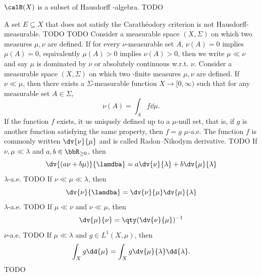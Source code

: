 \documentclass[a4paper,12pt]{article}
\begin{document}
$\calB(X)$ is a subset of Hausdorff \text{\textsigma}-algebra.
\bpr
TODO
\epr

A set $E\subseteq X$ that does not satisfy the Carathéodory criterion is not Hausdorff-measurable.
TODO
TODO
Consider a measurable space $(X,\Sigma)$ on which two measures $\mu,\nu$ are defined. If for every $\nu$-measurable set $A$, $\nu(A)=0$ implies $\mu(A)=0$, equivalently $\mu(A)>0$ implies $\nu(A)>0$, then we write $\mu\ll\nu$ and say $\mu$ is dominated by $\nu$ or absolutely continuous w.r.t. $\nu$.
Consider a measurable space $(X,\Sigma)$ on which two \textsigma-finite measures $\mu,\nu$ are defined. If $\nu\ll\mu$, then there exists a $\Sigma$-measurable function $X\to[0,\infty)$ such that for any measurable set $A\in\Sigma$,
\[\nu(A)=\int_Af\dd{\mu}.\]
If the function $f$ exists, it us uniquely defined up to a $\mu$-null set, that is, if $g$ is another function satisfying the same property, then $f=g$ $\mu$-a.e. The function $f$ is commonly written $\dv{\nu}{\mu}$ and is called Radon–Nikodym derivative.
\bpr
TODO
\epr
{}
If $\nu,\mu\ll\lambda$ and $a,b\in\bbR_{\ge0}$, then
\[\dv{(a\nu+b\mu)}{\lamdba}=a\dv{\nu}{\lambda}+b\dv{\mu}{\lambda}\]
$\lambda$-a.e.
\bpr
TODO
\epr
{}
If $\nu\ll\mu\ll\lambda$, then
\[\dv{\nu}{\lamdba}=\dv{\nu}{\mu}\dv{\mu}{\lambda}\]
$\lambda$-a.e.
\bpr
TODO
\epr
{}
If $\mu\ll\nu$ and $\nu\ll\mu$, then
\[\dv{\mu}{\nu}=\qty(\dv{\nu}{\mu})^{-1}\]
$\nu$-a.e.
\bpr
TODO
\epr
{}
If $\mu\ll\lambda$ and $g\in L^1(X,\mu)$, then
\[\int_Xg\dd{\mu}=\int_Xg\dv{\mu}{\lambda}\dd{\lambda}.\]
\bpr
TODO
\epr
\end{document}
